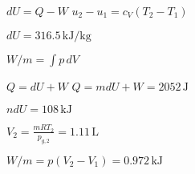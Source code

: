 \( dU = Q - W \)  
\( u_2 - u_1 = c_V (T_2 - T_1) \)  

\( dU = 316.5 \, \text{kJ/kg} \)  

\( W/m = \int p \, dV \)  

\( Q = dU + W \)  
\( Q = m dU + W = 2052 \, \text{J} \)  

\( n dU = 108 \, \text{kJ} \)  

\( V_2 = \frac{m R T_2}{p_{g,2}} = 1.11 \, \text{L} \)  

\( W/m = p (V_2 - V_1) = 0.972 \, \text{kJ} \)